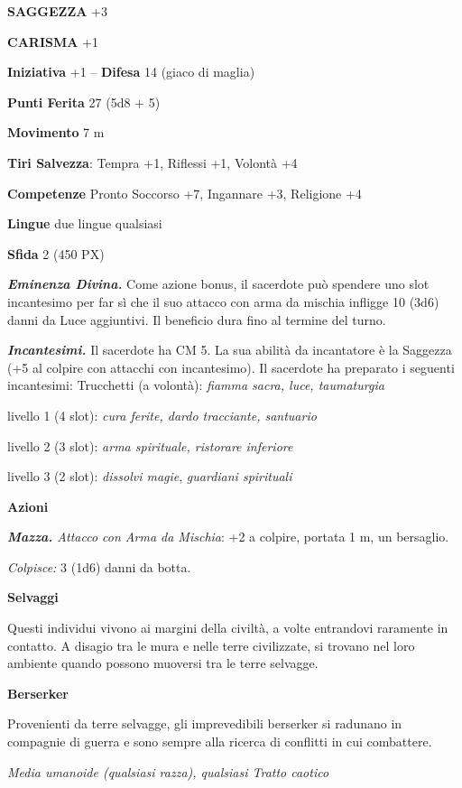 \begin{multicols}{2}
	\textbf{SAGGEZZA} +3

	\textbf{CARISMA} +1

	\textbf{Iniziativa} +1 -- \textbf{Difesa} 14 (giaco di maglia)

	\textbf{Punti Ferita} 27 (5d8 + 5)

	\textbf{Movimento} 7 m

	\textbf{Tiri Salvezza}: Tempra +1, Riflessi +1, Volontà +4

	\textbf{Competenze} Pronto Soccorso +7, Ingannare +3, Religione +4

	\textbf{Lingue} due lingue qualsiasi

	\textbf{Sfida} 2 (450 PX)

	\textit{\textbf{Eminenza Divina.}} Come azione bonus, il sacerdote può spendere uno slot incantesimo per far sì che il suo attacco con arma da mischia infligge 10 (3d6) danni da Luce aggiuntivi. Il beneficio dura fino al termine del turno.

	\textit{\textbf{Incantesimi.}} Il sacerdote ha CM 5. La sua abilità da incantatore è la Saggezza (+5 al colpire con attacchi con incantesimo). Il sacerdote ha preparato i seguenti incantesimi: Trucchetti (a volontà): \textit{fiamma sacra, luce, taumaturgia}

	livello 1 (4 slot): \textit{cura ferite, dardo tracciante, santuario}

	livello 2 (3 slot): \textit{arma spirituale, ristorare inferiore}

	livello 3 (2 slot): \textit{dissolvi magie}, \textit{guardiani spirituali}

	\textbf{Azioni}

	\textit{\textbf{Mazza.} Attacco con Arma da Mischia}: +2 a colpire, portata 1 m, un bersaglio.

	\textit{Colpisce:} 3 (1d6) danni da botta.


	\medskip\textbf{Selvaggi}

	Questi individui vivono ai margini della civiltà, a volte entrandovi raramente in contatto. A disagio tra le mura e nelle terre civilizzate, si trovano nel loro ambiente quando possono muoversi tra le terre selvagge.

	\medskip\textbf{Berserker}

	Provenienti da terre selvagge, gli imprevedibili berserker si radunano in compagnie di guerra e sono sempre alla ricerca di conflitti in cui combattere.

	\textit{Media umanoide (qualsiasi razza), qualsiasi Tratto caotico}


\end{multicols}
